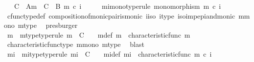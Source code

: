 \begin{isabellebody}
\ \ \ {\isachardoublequoteopen}C\ {\isasymsetminus}\ {\isacharparenleft}{\kern0pt}A{\isacharcomma}{\kern0pt}m{\isacharparenright}{\kern0pt}\ {\isacharequal}{\kern0pt}\ C\ {\isasymsetminus}\ {\isacharparenleft}{\kern0pt}B{\isacharcomma}{\kern0pt}\ m\ {\isasymcirc}\isactrlsub c\ i{\isacharparenright}{\kern0pt}{\isachardoublequoteclose}\isanewline
%
\isadelimproof
%
\endisadelimproof
%
\isatagproof
{}\isamarkupfalse%
\ {\isacharminus}{\kern0pt}\isanewline
\ \ \isamarkupfalse%
\ mi{\isacharunderscore}{\kern0pt}mono{\isacharbrackleft}{\kern0pt}type{\isacharunderscore}{\kern0pt}rule{\isacharbrackright}{\kern0pt}{\isacharcolon}{\kern0pt}\ {\isachardoublequoteopen}monomorphism\ {\isacharparenleft}{\kern0pt}m\ {\isasymcirc}\isactrlsub c\ i{\isacharparenright}{\kern0pt}{\isachardoublequoteclose}\isanewline
\ \ \ \ \isamarkupfalse%
\ cfunc{\isacharunderscore}{\kern0pt}type{\isacharunderscore}{\kern0pt}def\ composition{\isacharunderscore}{\kern0pt}of{\isacharunderscore}{\kern0pt}monic{\isacharunderscore}{\kern0pt}pair{\isacharunderscore}{\kern0pt}is{\isacharunderscore}{\kern0pt}monic\ i{\isacharunderscore}{\kern0pt}iso\ i{\isacharunderscore}{\kern0pt}type\ iso{\isacharunderscore}{\kern0pt}imp{\isacharunderscore}{\kern0pt}epi{\isacharunderscore}{\kern0pt}and{\isacharunderscore}{\kern0pt}monic\ m{\isacharunderscore}{\kern0pt}mono\ m{\isacharunderscore}{\kern0pt}type\ \isamarkupfalse%
\ presburger\isanewline
\ \ \isamarkupfalse%
\ {\isasymchi}m\ \ {\isasymchi}m{\isacharunderscore}{\kern0pt}type{\isacharbrackleft}{\kern0pt}type{\isacharunderscore}{\kern0pt}rule{\isacharbrackright}{\kern0pt}{\isacharcolon}{\kern0pt}\ {\isachardoublequoteopen}{\isasymchi}m\ {\isacharcolon}{\kern0pt}\ C\ {\isasymrightarrow}\ {\isasymOmega}{\isachardoublequoteclose}\ \ {\isasymchi}m{\isacharunderscore}{\kern0pt}def{\isacharcolon}{\kern0pt}\ {\isachardoublequoteopen}{\isasymchi}m\ {\isacharequal}{\kern0pt}\ characteristic{\isacharunderscore}{\kern0pt}func\ m{\isachardoublequoteclose}\isanewline
\ \ \ \ \isamarkupfalse%
\ characteristic{\isacharunderscore}{\kern0pt}func{\isacharunderscore}{\kern0pt}type\ m{\isacharunderscore}{\kern0pt}mono\ m{\isacharunderscore}{\kern0pt}type\ \isamarkupfalse%
\ blast\isanewline
\ \ \isamarkupfalse%
\ {\isasymchi}mi\ \ {\isasymchi}mi{\isacharunderscore}{\kern0pt}type{\isacharbrackleft}{\kern0pt}type{\isacharunderscore}{\kern0pt}rule{\isacharbrackright}{\kern0pt}{\isacharcolon}{\kern0pt}\ {\isachardoublequoteopen}{\isasymchi}mi\ {\isacharcolon}{\kern0pt}\ C\ {\isasymrightarrow}\ {\isasymOmega}{\isachardoublequoteclose}\ \ {\isasymchi}mi{\isacharunderscore}{\kern0pt}def{\isacharcolon}{\kern0pt}\ {\isachardoublequoteopen}{\isasymchi}mi\ {\isacharequal}{\kern0pt}\ characteristic{\isacharunderscore}{\kern0pt}func\ {\isacharparenleft}{\kern0pt}m\ {\isasymcirc}\isactrlsub c\ i{\isacharparenright}{\kern0pt}{\isachardoublequoteclose}\isanewline

\end{isabellebody}
